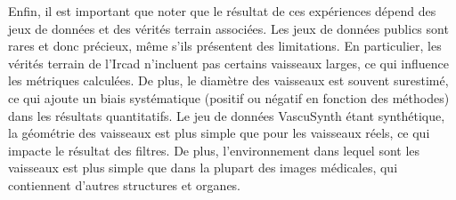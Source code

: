 
Enfin, il est important que noter que le résultat de ces expériences dépend des jeux de données et des vérités terrain associées. Les jeux de données publics sont rares et donc précieux, même s'ils présentent des limitations. En particulier, les vérités terrain de l'Ircad n'incluent pas certains vaisseaux larges, ce qui influence les métriques calculées. De plus, le diamètre des vaisseaux est souvent surestimé, ce qui ajoute un biais systématique (positif ou négatif en fonction des méthodes) dans les résultats quantitatifs. Le jeu de données VascuSynth étant synthétique, la géométrie des vaisseaux est plus simple que pour les vaisseaux réels, ce qui impacte le résultat des filtres. De plus, l'environnement dans lequel sont les vaisseaux est plus simple que dans la plupart des images médicales, qui contiennent d'autres structures et organes.



